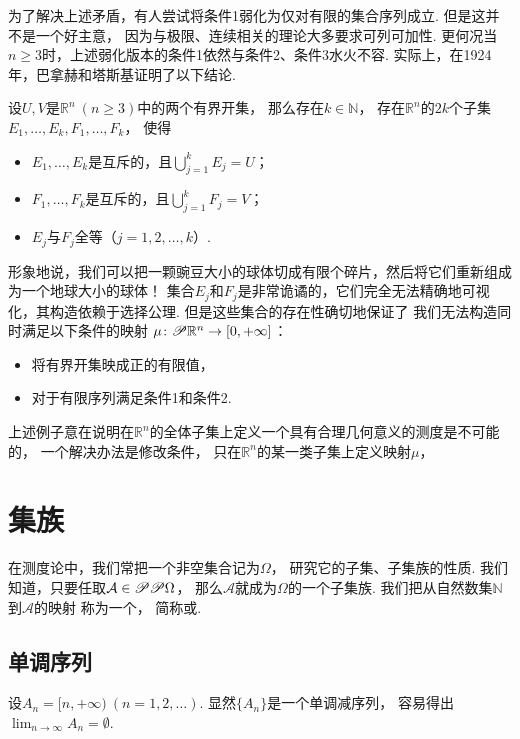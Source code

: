 为了解决上述矛盾，有人尝试将条件1弱化为仅对有限的集合序列成立.
但是这并不是一个好主意，
因为与极限、连续相关的理论大多要求可列可加性.
更何况当\(n \geq 3\)时，上述弱化版本的条件1依然与条件2、条件3水火不容.
实际上，在1924年，巴拿赫和塔斯基证明了以下结论.
\begin{proposition}
设\(U,V\)是\(\mathbb{R}^n\ (n \geq 3)\)中的两个有界开集，
那么存在\(k \in \mathbb{N}\)，
存在\(\mathbb{R}^n\)的\(2k\)个子集\(E_1,\dotsc,E_k,F_1,\dotsc,F_k\)，
使得\begin{itemize}
	\item \(E_1,\dotsc,E_k\)是互斥的，且\(\bigcup_{j=1}^k E_j = U\)；
	\item \(F_1,\dotsc,F_k\)是互斥的，且\(\bigcup_{j=1}^k F_j = V\)；
	\item \(E_j\)与\(F_j\)全等（\(j=1,2,\dotsc,k\)）.
\end{itemize}
\end{proposition}
形象地说，我们可以把一颗豌豆大小的球体切成有限个碎片，然后将它们重新组成为一个地球大小的球体！
集合\(E_j\)和\(F_j\)是非常诡谲的，它们完全无法精确地可视化，其构造依赖于选择公理.
但是这些集合的存在性确切地保证了
我们无法构造同时满足以下条件的映射
\(\mu\colon \mathscr{P}\mathbb{R}^n \to [0,+\infty]\)：
\begin{itemize}
	\item 将有界开集映成正的有限值，
	\item 对于有限序列满足条件1和条件2.
\end{itemize}

上述例子意在说明在\(\mathbb{R}^n\)的全体子集上定义一个具有合理几何意义的测度是不可能的，
一个解决办法是修改条件，
只在\(\mathbb{R}^n\)的某一类子集上定义映射\(\mu\)，

\section{集族}
在测度论中，我们常把一个非空集合记为\(\Omega\)，
研究它的子集、子集族的性质.
我们知道，只要任取\(\mathcal{A} \in \mathscr{P}\mathscr{P}\Omega\)，
那么\(\mathcal{A}\)就成为\(\Omega\)的一个子集族.
我们把从自然数集\(\mathbb{N}\)到\(\mathcal{A}\)的映射
称为一个，
简称或.

\subsection{单调序列}
\begin{example}
设\(A_n = [n,+\infty)\ (n=1,2,\dotsc)\).
显然\(\{A_n\}\)是一个单调减序列，
容易得出\(\lim_{n\to\infty} A_n = \emptyset\).
\end{example}


